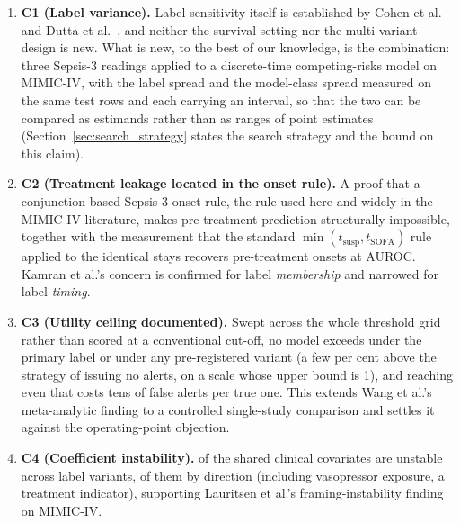 \begin{enumerate}
    \item \textbf{C1 (Label variance).} Label sensitivity itself is established
    by Cohen et al.\ \cite{cohen2024subtle} and Dutta et al.\
    \cite{dutta2026performance}, and neither the survival setting nor the
    multi-variant design is new. What is new, to the best of our knowledge, is
    the combination: three Sepsis-3 readings applied to a discrete-time
    competing-risks model on MIMIC-IV, with the label spread and the
    model-class spread measured on the same test rows and each carrying an
    interval, so that the two can be compared as estimands rather than as
    ranges of point estimates (Section~\ref{sec:search_strategy} states the
    search strategy and the bound on this claim).

    \item \textbf{C2 (Treatment leakage located in the onset rule).} A proof that
    a conjunction-based Sepsis-3 onset rule, the rule used here and widely in
    the MIMIC-IV literature, makes pre-treatment prediction structurally
    impossible, together with the measurement that the standard
    $\min(t_{\text{susp}}, t_{\text{SOFA}})$ rule applied to the identical stays
    recovers \pcPreTreatOnsetsVarF{} pre-treatment onsets at
    \pcPreTreatAurocPrimaryF{} AUROC. Kamran et al.'s
    \cite{kamran2024evaluation} concern is confirmed for label \emph{membership}
    and narrowed for label \emph{timing}.

    \item \textbf{C3 (Utility ceiling documented).} Swept across the whole
    threshold grid rather than scored at a conventional cut-off, no model
    exceeds \pcUtilityMaxGbtB{} under the primary label or
    \pcUtilityMaxGbtC{} under any pre-registered variant (a few per cent
    above the strategy of issuing no alerts, on a scale whose upper bound is 1), and reaching even that costs tens of false alerts per true one. This
    extends Wang et al.'s \cite{wang2025srpm} meta-analytic finding to a
    controlled single-study comparison and settles it against the
    operating-point objection.

    \item \textbf{C4 (Coefficient instability).} \pcHTwoEst{} of the
    \pcHTwoNTerms{} shared clinical covariates are unstable across label
    variants, \pcHTwoNSign{} of them by direction (including vasopressor
    exposure, a treatment indicator), supporting Lauritsen et al.'s
    \cite{lauritsen2021framing} framing-instability finding on MIMIC-IV.


\end{enumerate}
